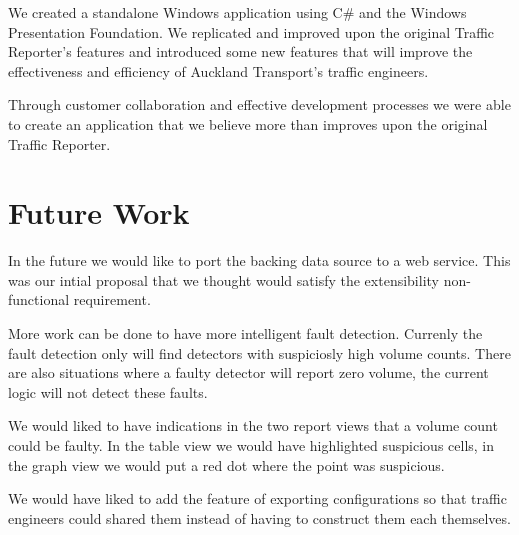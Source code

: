 \documentclass{article}
\begin{document}
We created a standalone Windows application using C\# and the Windows Presentation Foundation. We replicated and improved upon the original Traffic Reporter's features and introduced some new features that will improve the effectiveness and efficiency of Auckland Transport's traffic engineers.

Through customer collaboration and effective development processes we were able to create an application that we believe more than improves upon the original Traffic Reporter.

\section{Future Work}

In the future we would like to port the backing data source to a web service. This was our intial proposal that we thought would satisfy the extensibility non-functional requirement.

More work can be done to have more intelligent fault detection. Currenly the fault detection only will find detectors with suspiciosly high volume counts. There are also situations where a faulty detector will report zero volume, the current logic will not detect these faults.

We would liked to have indications in the two report views that a volume count could be faulty. In the table view we would have highlighted suspicious cells, in the graph view we would put a red dot where the point was suspicious.

We would have liked to add the feature of exporting configurations so that traffic engineers could shared them instead of having to construct them each themselves.



\end{document}
